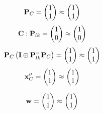 \documentclass[10pt,a4paper]{article}
\begin{document}
	\[
		\bold{P}_{C} = 
		\begin{pmatrix}
			{1}{} \\
			{1}{} \\
		\end{pmatrix}
		\approx
		\begin{pmatrix}
			1        \\
			1        \\
		\end{pmatrix}
	\]
	\[
		\bold{C}: \bold{P}_{lk} = 
		\begin{pmatrix}
			{1}{} \\
			{{0}}{} \\
		\end{pmatrix}
		\approx
		\begin{pmatrix}
			1        \\
			0        \\
		\end{pmatrix}
	\]
	\[
		\bold{P}_{C}\left(\bold{I} \oplus \bold{P}_{lk}^{-}\bold{P}_{C}\right) = 
		\begin{pmatrix}
			{1}{} \\
			{1}{} \\
		\end{pmatrix}
		\approx
		\begin{pmatrix}
			1        \\
			1        \\
		\end{pmatrix}
	\]
	\[
		\bold{x}''_{C} = 
		\begin{pmatrix}
			{1}{} \\
			{1}{} \\
		\end{pmatrix}
		\approx
		\begin{pmatrix}
			1        \\
			1        \\
		\end{pmatrix}
	\]

	\[
		\bold{w} = 
		\begin{pmatrix}
			{1}{} \\
			{1}{} \\
		\end{pmatrix}
		\approx
		\begin{pmatrix}
			1        \\
			1        \\
		\end{pmatrix}
	\]
\end{document}
